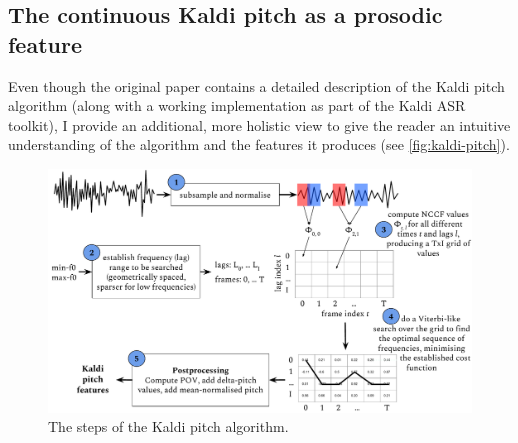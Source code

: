 \documentclass[bsc,frontabs,twoside,singlespacing,parskip,deptreport]{infthesis}
\begin{document}
{{    \subsection{The continuous Kaldi pitch as a prosodic feature}{
      \label{sec:kaldi-pitch}
      Even though the original paper \citep{Ghahremani_et_al_2014} contains a detailed description of the Kaldi pitch algorithm (along with a working implementation as part of the Kaldi ASR toolkit), I provide an additional, more holistic view to give the reader an intuitive understanding of the algorithm and the features it produces (see \autoref{fig:kaldi-pitch}).
      \begin{figure}[h!t]
        \centering
        \includegraphics[width=\textwidth]{graphics/kaldi-pitch}
        \vspace*{-1em}
        \caption{The steps of the Kaldi pitch algorithm.}
        \label{fig:kaldi-pitch}
      \end{figure}
}}}
\end{document}
